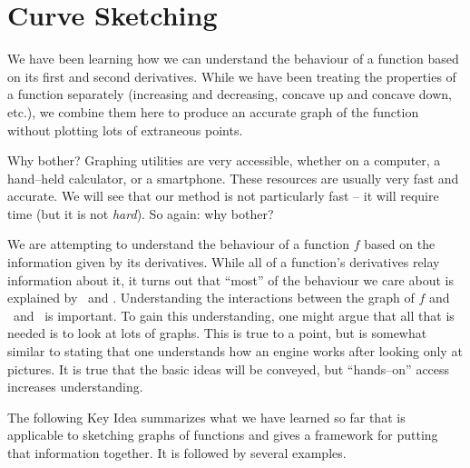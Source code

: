 \section{Curve Sketching}\label{sec:sketch}


We have been learning how we can understand the behaviour of a function based on its first and second derivatives. While we have been treating the properties of a function separately (increasing and decreasing, concave up and concave down, etc.), we combine them here to produce an accurate graph of the function without plotting lots of extraneous points.

Why bother? Graphing utilities are very accessible, whether on a computer, a hand--held calculator, or a smartphone. These resources are usually very fast and accurate. We will see that our method is not particularly fast -- it will require time (but it is not \textit{hard}). So again: why bother?

We are attempting to understand the behaviour of a function $f$ based on the information given by its derivatives. While all of a function's derivatives relay information about it, it turns out that ``most'' of the behaviour we care about is explained by \fp\ and \fpp. Understanding the interactions between the graph of $f$ and \fp\ and \fpp\ is important. To gain this understanding, one might argue that all that is needed is to look at lots of graphs. This is true to a point, but is somewhat similar to stating that one understands how an engine works after looking only at pictures. It is true that the basic ideas will be conveyed, but ``hands--on'' access increases understanding.

The following Key Idea summarizes what we have learned so far that is applicable to sketching graphs of functions and gives a framework for putting that information together. It is followed by several examples.


